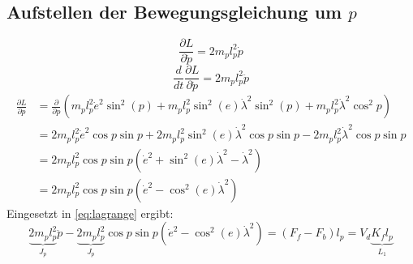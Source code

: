 \documentclass{article}
\begin{document}
\subsection{Aufstellen der Bewegungsgleichung um $p$}
\begin{equation}
\frac{\partial L}{\partial \dot{p}} = 2m_p l_p^2 \dot{p}
\end{equation}
\begin{equation}
\frac{d}{dt}\frac{\partial L}{\partial \dot{p}} = 2m_p l_p^2 \ddot{p}
\end{equation}
\begin{equation}
\begin{split}
\frac{\partial L}{\partial p} &= \frac{\partial}{\partial p}(  m_p l_p^2 \dot{e}^2 \sin^2 (p) 
+ m_p l_p^2 \sin^2 (e) \dot{\lambda}^2 \sin^2 (p)
+ m_p l_p^2 \dot{\lambda}^2 \cos^2 p)\\
&= 2 m_p l_p^2 \dot{e}^2 \cos p \sin p + 2 m_p l_p^2 \sin^2 (e) \dot{\lambda}^2 \cos p \sin p 
- 2 m_p l_p^2 \dot{\lambda}^2 \cos p \sin p\\
&= 2 m_p l_p^2 \cos p \sin p (\dot{e}^2+ \sin^2 (e) \dot{\lambda}^2- \dot{\lambda}^2)\\
&= 2 m_p l_p^2 \cos p \sin p (\dot{e}^2- \cos^2 (e) \dot{\lambda}^2)
\end{split}
\end{equation}
Eingesetzt in \eqref{eq:lagrange} ergibt:
\begin{equation}
\underbrace{2m_p l_p^2}_{J_p} \ddot{p} -  \underbrace{2 m_p l_p^2}_{J_p} \cos p \sin p (\dot{e}^2- \cos^2 (e) \dot{\lambda}^2) = (F_f - F_b)l_p = V_d \underbrace{K_f l_p}_{L_1}
\end{equation}
\end{document}
